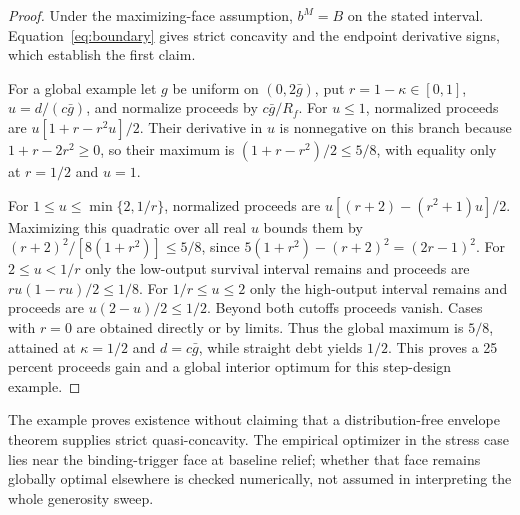 \documentclass[11pt]{article}
\begin{document}
\begin{proof}
Under the maximizing-face assumption, $b^M=B$ on the stated interval. Equation~\eqref{eq:boundary} gives strict concavity and the endpoint derivative signs, which establish the first claim.

For a global example let $g$ be uniform on $(0,2\bar g)$, put $r=1-\kappa\in[0,1]$, $u=d/(c\bar g)$, and normalize proceeds by $c\bar g/R_f$. For $u\le1$, normalized proceeds are $u[1+r-r^2u]/2$. Their derivative in $u$ is nonnegative on this branch because $1+r-2r^2\ge0$, so their maximum is $(1+r-r^2)/2\le5/8$, with equality only at $r=1/2$ and $u=1$.

For $1\le u\le\min\{2,1/r\}$, normalized proceeds are $u[(r+2)-(r^2+1)u]/2$. Maximizing this quadratic over all real $u$ bounds them by $(r+2)^2/[8(1+r^2)]\le5/8$, since $5(1+r^2)-(r+2)^2=(2r-1)^2$. For $2\le u<1/r$ only the low-output survival interval remains and proceeds are $ru(1-ru)/2\le1/8$. For $1/r\le u\le2$ only the high-output interval remains and proceeds are $u(2-u)/2\le1/2$. Beyond both cutoffs proceeds vanish. Cases with $r=0$ are obtained directly or by limits. Thus the global maximum is $5/8$, attained at $\kappa=1/2$ and $d=c\bar g$, while straight debt yields $1/2$. This proves a 25 percent proceeds gain and a global interior optimum for this step-design example.
\end{proof}
The example proves existence without claiming that a distribution-free envelope theorem supplies strict quasi-concavity. The empirical optimizer in the stress case lies near the binding-trigger face at baseline relief; whether that face remains globally optimal elsewhere is checked numerically, not assumed in interpreting the whole generosity sweep.
\end{document}

